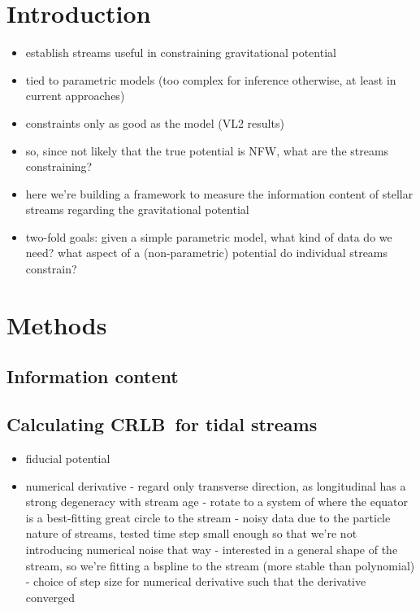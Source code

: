 \documentclass[modern]{aastex61}
\newcommand{\acronym}[1]{{\small{#1}}}
\newcommand{\CRLB}{\acronym{CRLB}}
\begin{document}

\section{Introduction} \label{sec:intro}

\begin{itemize}
 \item establish streams useful in constraining gravitational potential
 \item tied to parametric models (too complex for inference otherwise, at least in current approaches)
 \item constraints only as good as the model (VL2 results)
 \item so, since not likely that the true potential is NFW, what are the streams constraining? 
 \item here we're building a framework to measure the information content of stellar streams regarding the gravitational potential
 \item two-fold goals: given a simple parametric model, what kind of data do we need? what aspect of a (non-parametric) potential do individual streams constrain?
\end{itemize}


\section{Methods}
\label{sec:method}

\subsection{Information content}

\subsection{Calculating \CRLB\ for tidal streams}

\begin{itemize}
 \item fiducial potential
 \item numerical derivative
 - regard only transverse direction, as longitudinal has a strong degeneracy with stream age
 - rotate to a system of where the equator is a best-fitting great circle to the stream
 - noisy data due to the particle nature of streams, tested time step small enough so that we're not introducing numerical noise that way
 - interested in a general shape of the stream, so we're fitting a bspline to the stream (more stable than polynomial)
 - choice of step size for numerical derivative such that the derivative converged
\end{itemize}
\end{document}
